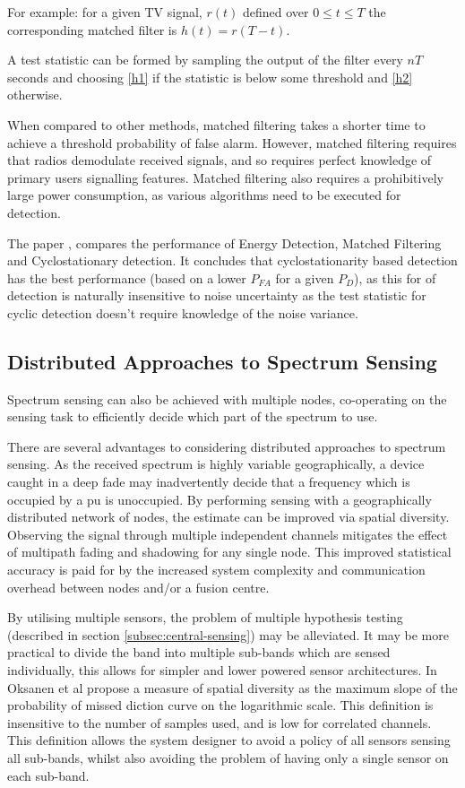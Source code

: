 For example: for a given TV signal, \(r\left(t\right)\) defined over \(0 \leq t \leq T\) the corresponding matched filter is \(h\left(t\right) = r\left(T - t\right)\). 

A test statistic can be formed by sampling the output of the filter every \(nT\) seconds and choosing \ref{h1} if the statistic is below some threshold and \ref{h2} otherwise.

When compared to other methods, matched filtering takes a shorter time to achieve a threshold probability of false alarm. However, matched filtering requires that radios demodulate received signals, and so requires perfect knowledge of primary users signalling features. Matched filtering also requires a prohibitively large power consumption, as various algorithms need to be executed for detection.

The paper \cite{bhargavi2010performance}, compares the performance of Energy Detection, Matched Filtering and Cyclostationary detection. It concludes that cyclostationarity based detection has the best performance (based on a lower \(P_{FA}\) for a given \(P_D\)), as this for of detection is naturally insensitive to noise uncertainty as the test statistic for cyclic detection doesn't require knowledge of the noise variance.

\subsection{Distributed Approaches to Spectrum Sensing}
Spectrum sensing can also be achieved with multiple nodes, co-operating on the sensing task to efficiently decide which part of the spectrum to use. 

There are several advantages to considering distributed approaches to spectrum sensing. As the received spectrum is highly variable geographically, a device caught in a deep fade may inadvertently decide that a frequency which is occupied by a \gls{pu} is unoccupied. By performing sensing with a geographically distributed network of nodes, the estimate can be improved via spatial diversity. Observing the signal through multiple independent channels mitigates the effect of multipath fading and shadowing for any single node. This improved statistical accuracy is paid for by the increased system complexity and communication overhead between nodes and/or a fusion centre. 

By utilising multiple sensors, the problem of multiple hypothesis testing (described in section \ref{subsec:central-sensing}) may be alleviated. It may be more practical to divide the band into multiple sub-bands which are sensed individually, this allows for simpler and lower powered sensor architectures. In \cite{oksanen2010characterization} Oksanen et al propose a measure of spatial diversity as the maximum slope of the probability of missed diction curve on the logarithmic scale. This definition is insensitive to the number of samples used, and is low for correlated channels. This definition allows the system designer to avoid a policy of all sensors sensing all sub-bands, whilst also avoiding the problem of having only a single sensor on each sub-band. 

